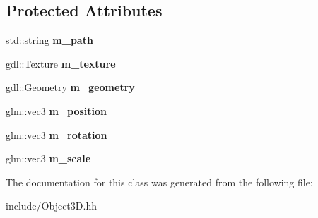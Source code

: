 \subsection*{Protected Attributes}
\begin{DoxyCompactItemize}
\item 
\hypertarget{class_object3_d_aa4d1f5a78ebc30385ca75c3977f92924}{}std\+::string {\bfseries m\+\_\+path}\label{class_object3_d_aa4d1f5a78ebc30385ca75c3977f92924}

\item 
\hypertarget{class_object3_d_acbd31017b9b1661176087d124ce05fd9}{}gdl\+::\+Texture {\bfseries m\+\_\+texture}\label{class_object3_d_acbd31017b9b1661176087d124ce05fd9}

\item 
\hypertarget{class_object3_d_ab3cbc0244704ef6a01ee2f8065921881}{}gdl\+::\+Geometry {\bfseries m\+\_\+geometry}\label{class_object3_d_ab3cbc0244704ef6a01ee2f8065921881}

\item 
\hypertarget{class_object3_d_a20209643836dd85b4a2639ab43e6bf6f}{}glm\+::vec3 {\bfseries m\+\_\+position}\label{class_object3_d_a20209643836dd85b4a2639ab43e6bf6f}

\item 
\hypertarget{class_object3_d_a2f7bc78b14bc5065f2197138f149956f}{}glm\+::vec3 {\bfseries m\+\_\+rotation}\label{class_object3_d_a2f7bc78b14bc5065f2197138f149956f}

\item 
\hypertarget{class_object3_d_a7e6ddf5e678c96541cb3e600efe56be2}{}glm\+::vec3 {\bfseries m\+\_\+scale}\label{class_object3_d_a7e6ddf5e678c96541cb3e600efe56be2}

\end{DoxyCompactItemize}


The documentation for this class was generated from the following file\+:\begin{DoxyCompactItemize}
\item 
include/Object3\+D.\+hh\end{DoxyCompactItemize}
